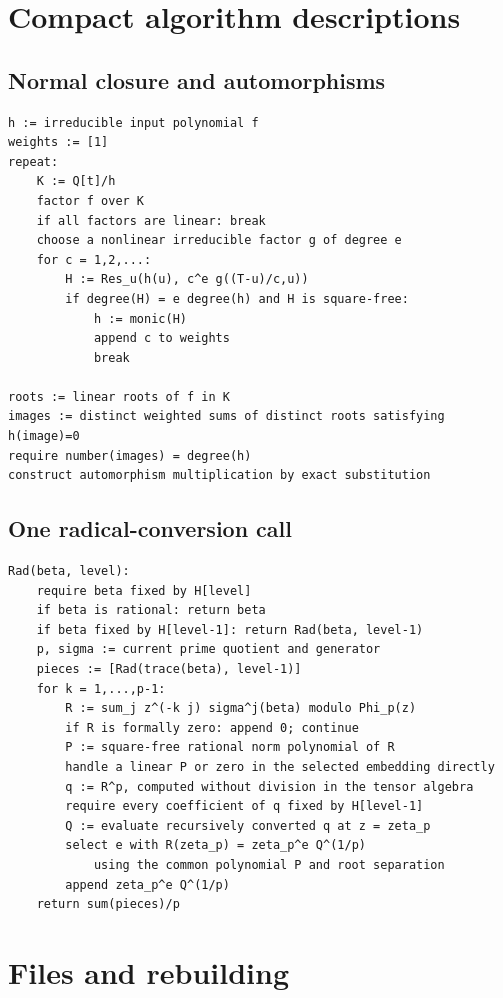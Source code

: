\documentclass[11pt]{article}
\theoremstyle{definition}\newtheorem{definition}[theorem]{Definition}
\theoremstyle{remark}\newtheorem{remark}[theorem]{Remark}
\begin{document}
\clearpage
\appendix
\section{Compact algorithm descriptions}

\subsection{Normal closure and automorphisms}
\begin{lstlisting}
h := irreducible input polynomial f
weights := [1]
repeat:
    K := Q[t]/h
    factor f over K
    if all factors are linear: break
    choose a nonlinear irreducible factor g of degree e
    for c = 1,2,...:
        H := Res_u(h(u), c^e g((T-u)/c,u))
        if degree(H) = e degree(h) and H is square-free:
            h := monic(H)
            append c to weights
            break

roots := linear roots of f in K
images := distinct weighted sums of distinct roots satisfying h(image)=0
require number(images) = degree(h)
construct automorphism multiplication by exact substitution
\end{lstlisting}

\subsection{One radical-conversion call}
\begin{lstlisting}
Rad(beta, level):
    require beta fixed by H[level]
    if beta is rational: return beta
    if beta fixed by H[level-1]: return Rad(beta, level-1)
    p, sigma := current prime quotient and generator
    pieces := [Rad(trace(beta), level-1)]
    for k = 1,...,p-1:
        R := sum_j z^(-k j) sigma^j(beta) modulo Phi_p(z)
        if R is formally zero: append 0; continue
        P := square-free rational norm polynomial of R
        handle a linear P or zero in the selected embedding directly
        q := R^p, computed without division in the tensor algebra
        require every coefficient of q fixed by H[level-1]
        Q := evaluate recursively converted q at z = zeta_p
        select e with R(zeta_p) = zeta_p^e Q^(1/p)
            using the common polynomial P and root separation
        append zeta_p^e Q^(1/p)
    return sum(pieces)/p
\end{lstlisting}

\section{Files and rebuilding}
\end{document}

